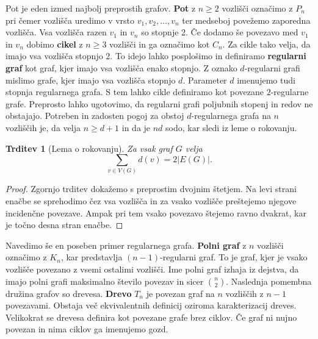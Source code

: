 \documentclass[12pt,a4paper,twoside]{article}
\theoremstyle{definition} %
\theoremstyle{plain} %
\newtheorem{trditev}[definicija]{Trditev}
\numberwithin{equation}{section}  %
\begin{document}
Pot je eden izmed najbolj preprostih grafov. \textbf{Pot} z $n \ge 2$ vozlišči označimo z $P_n$ pri čemer vozlišča uredimo v vrsto $v_1, v_2, \ldots, v_n$ ter medseboj povežemo zaporedna vozlišča. Vsa vozlišča razen $v_1$ in $v_n$ so stopnje 2. Če dodamo še povezavo med $v_1$ in $v_n$ dobimo \textbf{cikel} z $n \ge 3$ vozlišči in ga označimo kot $C_n$. Za cikle tako velja, da imajo vsa vozlišča stopnjo 2. To idejo lahko posplošimo in definiramo \textbf{regularni graf} kot graf, kjer imajo vsa vozlišča enako stopnjo. Z oznako $d$-regularni grafi mislimo grafe, kjer imajo vsa vozlišča stopnjo $d$. Parameter $d$ imenujemo tudi stopnja regularnega grafa. S tem lahko cikle definiramo kot povezane $2$-regularne grafe. Preprosto lahko ugotovimo, da regularni grafi poljubnih stopenj in redov ne obstajajo. Potreben in zadosten pogoj za obstoj $d$-regularnega grafa na $n$ vozliščih je, da velja $n \ge d + 1$ in da je $nd$ sodo, kar sledi iz leme o rokovanju.
\begin{trditev}[Lema o rokovanju]
Za vsak graf $G$ velja
$$ \sum_{v \in V(G)} d(v) = 2 |E(G)|. $$
\end{trditev}
\begin{proof}
Zgornjo trditev dokažemo s preprostim dvojnim štetjem. Na levi strani enačbe se sprehodimo čez vsa vozlišča in za vsako vozlišče preštejemo njegove incidenčne povezave.
Ampak pri tem vsako povezavo štejemo ravno dvakrat, kar je točno desna stran enačbe.
\end{proof}
 Navedimo še en poseben primer regularnega grafa. \textbf{Polni graf} z $n$ vozlišči označimo z $K_n$, kar predstavlja $(n-1)$-regularni graf. To je graf, kjer je vsako vozlišče povezano z vsemi ostalimi vozlišči. Ime polni graf izhaja iz dejstva, da imajo polni grafi maksimalno število povezav in sicer ${n \choose 2}$. Naslednja pomembna družina grafov so drevesa. \textbf{Drevo} $T_n$ je povezan graf na $n$ vozliščih z $n-1$ povezavami. Obstaja več ekvivalentnih definicij oziroma karakterizacij dreves. Velikokrat se drevesa definira kot povezane grafe brez ciklov. Če graf ni nujno povezan in nima ciklov ga imenujemo gozd.
\end{document}
